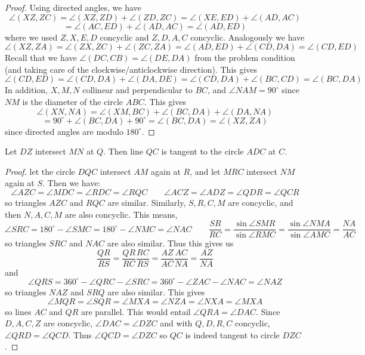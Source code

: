 \documentclass[11pt,a4paper]{article}
\begin{document}
\begin{enumerate}
        \begin{proof}
        	Using directed angles, we have 
        	\[\angle(XZ, ZC)
        	=\angle(XZ, ZD)+\angle(ZD, ZC)
        	=\angle(XE, ED)+\angle(AD, AC)
        	\]\[
        	=\angle(AC, ED)+\angle(AD, AC)
        	=\angle(AD, ED)
        	\]
        	where we used $Z, X, E, D$ concyclic and $Z, D, A, C$ concyclic. 
        	Analogously we have 
        	\[
        	\angle(XZ, ZA)
        	=\angle(ZX, ZC)+\angle(ZC, ZA)
        	=\angle(AD, ED)+\angle (CD, DA)
        	=\angle(CD, ED)
        	\]
        	Recall that we have $\angle(DC, CB)=\angle(DE, DA)$ from the problem condition (and taking care of the clockwise/anticlockwise direction). 
        	This gives 
        	\[
        	\angle(CD, ED)=\angle(CD, DA)+\angle(DA, DE)=\angle(CD, DA)+\angle(BC, CD)=\angle(BC, DA)
        	\]
        	In addition, $X, M, N$ collinear and perpendicular to $BC$, and $\angle NAM=90^{\circ}$ since $NM$ is the diameter of the circle $ABC$. This gives 
        	\[
        	\angle(XN, NA)=\angle(XM, BC)+\angle(BC, DA)+\angle(DA, NA)
        	\]\[=90^{\circ}+\angle(BC, DA)+90^{\circ}=\angle(BC, DA)=\angle(XZ, ZA)
        	\]
        	since directed angles are modulo $180^{\circ}$.
        \end{proof}
        
        \begin{lemma}
        	\label{lemma_g7c}
        	Let $DZ$ intersect $MN$ at $Q$. Then line $QC$ is tangent to the circle $ADC$ at $C$. 
        \end{lemma}
        
        \begin{proof}
        	let the circle $DQC$ intersect $AM$ again at $R$, and let $MRC$ intersect $NM$ again at $S$. Then we have: 
        	\[
        	\angle AZC=\angle MDC=\angle RDC=\angle RQC
        	\qquad 
        	\angle ACZ=\angle ADZ=\angle QDR=\angle QCR
        	\]
        	so triangles $AZC$ and $RQC$ are similar. Similarly, 
        	$S, R, C, M$ are concyclic, and then $N, A, C, M$ are also concyclic. This means, 
        	\[
        	\angle SRC=180^{\circ}-\angle SMC=180^{\circ}-\angle NMC=\angle NAC
        	\qquad
        	\frac{SR}{RC}=\frac{\sin\angle SMR}{\sin\angle RMC}=\frac{\sin\angle NMA}{\sin\angle AMC}=\frac{NA}{AC}
        	\]
        	so triangles $SRC$ and $NAC$ are also similar. 
        	Thus this gives us 
        	\[
        	\frac{QR}{RS}=\frac{QR}{RC}\frac{RC}{RS}=\frac{AZ}{AC}\frac{AC}{NA}=\frac{AZ}{NA}
        	\]
        	and 
        	\[
        	\angle QRS=360^{\circ}-\angle QRC-\angle SRC=360^{\circ}-\angle ZAC -\angle NAC=\angle NAZ
        	\]
        	so triangles $NAZ$ and $SRQ$ are also similar. This gives 
        	\[
        	\angle MQR=\angle SQR=\angle MXA=\angle NZA=\angle NXA=\angle MXA
        	\]
        	so lines $AC$ and $QR$ are parallel. 
        	This would entail $\angle QRA=\angle DAC$. Since $D, A, C, Z$ are concyclic, $\angle DAC=\angle DZC$ and with $Q, D, R, C$ concyclic, $\angle QRD=\angle QCD$. Thus $\angle QCD=\angle DZC$ so $QC$ is indeed tangent to circle $DZC$. 
        \end{proof}
        

\end{enumerate}
\end{document}
